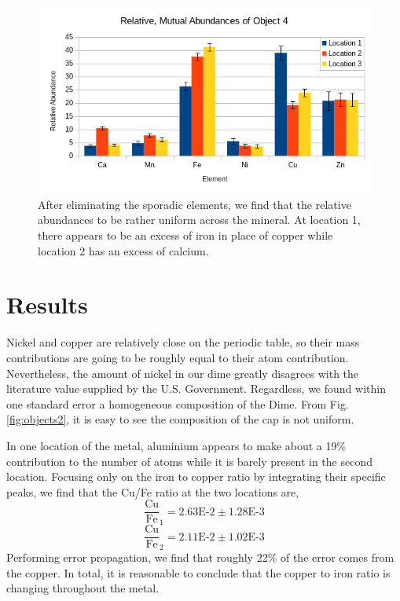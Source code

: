\documentclass[10pt]{IEEEtran}
\begin{document}
\begin{figure}
       \begin{center}
       \includegraphics[width=\columnwidth]{Object4Mutual}
       \caption{After eliminating the sporadic elements, we find that the relative abundances to be rather uniform across the mineral. At location 1, there appears to be an excess of iron in place of copper while location 2 has an excess of calcium.}
       \label{fig:mutual}
       \end{center}
\end{figure}
    
\section{Results}

Nickel and copper are relatively close on the periodic table, so their mass contributions are going to be roughly equal to their atom contribution. Nevertheless, the amount of nickel in our dime greatly disagrees with the literature value supplied by the U.S. Government. Regardless, we found within one standard error a homogeneous composition of the Dime. From Fig. \ref{fig:objects2}, it is easy to see the composition of the cap is not uniform.

In one location of the metal, aluminium appears to make about a 19\% contribution to the number of atoms while it is barely present in the second location. Focusing only on the iron to copper ratio by integrating their specific peaks, we find that the Cu/Fe ratio at the two locations are,
\[
\frac{\text{Cu}}{\text{Fe}}_1 = 2.63\text{E-2} \pm 1.28\text{E-3}
\]
\[
\frac{\text{Cu}}{\text{Fe}}_2 = 2.11\text{E-2} \pm 1.02\text{E-3}
\]
Performing error propagation, we find that roughly 22\% of the error comes from the copper. In total, it is reasonable to conclude that the copper to iron ratio is changing throughout the metal.
\end{document}
